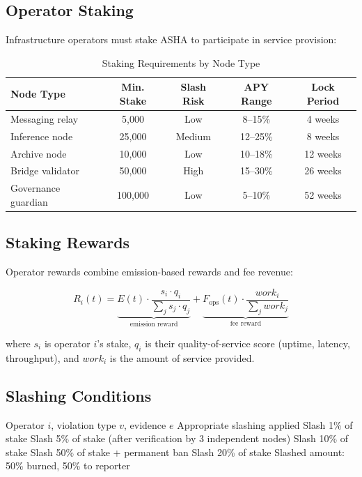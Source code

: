 \documentclass[11pt,a4paper]{article}
\newcommand{\asha}{\textsc{ASHA}\xspace}
\begin{document}
\subsection{Operator Staking}

Infrastructure operators must stake \asha to participate in service provision:

\begin{table}[H]
\centering
\caption{Staking Requirements by Node Type}
\label{tab:staking}
\begin{tabular}{lcccc}
\toprule
\textbf{Node Type} & \textbf{Min. Stake} & \textbf{Slash Risk} & \textbf{APY Range} & \textbf{Lock Period} \\
\midrule
Messaging relay & 5{,}000 & Low & 8--15\% & 4 weeks \\
Inference node & 25{,}000 & Medium & 12--25\% & 8 weeks \\
Archive node & 10{,}000 & Low & 10--18\% & 12 weeks \\
Bridge validator & 50{,}000 & High & 15--30\% & 26 weeks \\
Governance guardian & 100{,}000 & Low & 5--10\% & 52 weeks \\
\bottomrule
\end{tabular}
\end{table}

\subsection{Staking Rewards}

Operator rewards combine emission-based rewards and fee revenue:

\begin{equation}
    R_i(t) = \underbrace{E(t) \cdot \frac{s_i \cdot q_i}{\sum_j s_j \cdot q_j}}_{\text{emission reward}} + \underbrace{F_{\text{ops}}(t) \cdot \frac{\mathit{work}_i}{\sum_j \mathit{work}_j}}_{\text{fee reward}}
\end{equation}

where $s_i$ is operator $i$'s stake, $q_i$ is their quality-of-service score (uptime, latency, throughput), and $\mathit{work}_i$ is the amount of service provided.

\subsection{Slashing Conditions}

\begin{algorithm}[H]
\caption{Slashing Protocol}
\label{alg:slash}
\begin{algorithmic}[1]
\Require Operator $i$, violation type $v$, evidence $e$
\Ensure Appropriate slashing applied
    \State Slash 1\% of stake
    \State Slash 5\% of stake (after verification by 3 independent nodes)
    \State Slash 10\% of stake
    \State Slash 50\% of stake + permanent ban
    \State Slash 20\% of stake
\EndIf
\State Slashed amount: 50\% burned, 50\% to reporter
\end{algorithmic}
\end{algorithm}
\end{document}
